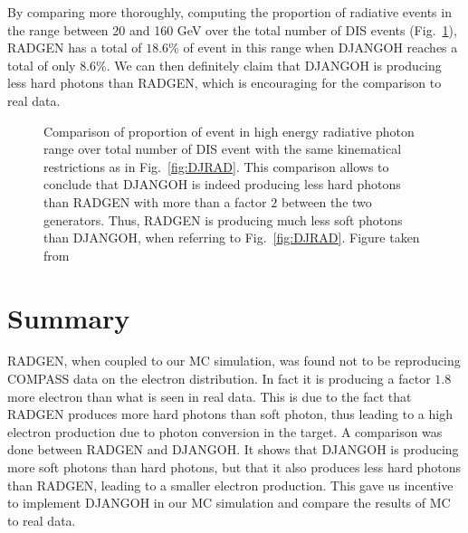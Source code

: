 By comparing more thoroughly, computing the proportion of radiative events in the range between 20 and 160 GeV over the total number of DIS events (Fig.~\ref{fig:tabDJRAD}), RADGEN has a total of $18.6$\% of event in this range when DJANGOH reaches a total of only $8.6$\%. We can then definitely claim that DJANGOH is producing less hard photons than RADGEN, which is encouraging for the comparison to real data.

\begin{figure}[htb]
\centerline{}
\caption{Comparison of proportion of event in high energy radiative photon range over total number of DIS event with the same kinematical restrictions as in Fig.~\ref{fig:DJRAD}. This comparison allows to conclude that DJANGOH is indeed producing less hard photons than RADGEN with more than a factor $2$ between the two generators. Thus, RADGEN is producing much less soft photons than DJANGOH, when referring to Fig.~\ref{fig:DJRAD}. Figure taken from \cite{DJANGOHnote}}\label{fig:tabDJRAD}
\end{figure}

\newpage


\section{Summary}

RADGEN, when coupled to our MC simulation, was found not to be reproducing COMPASS data on the electron distribution. In fact it is producing a factor $1.8$ more electron than what is seen in real data. This is due to the fact that RADGEN produces more hard photons than soft photon, thus leading to a high electron production due to photon conversion in the target. A comparison was done between RADGEN and DJANGOH. It shows that DJANGOH is producing more soft photons than hard photons, but that it also produces less hard photons than RADGEN, leading to a smaller electron production. This gave us incentive to implement DJANGOH in our MC simulation and compare the results of MC to real data.
